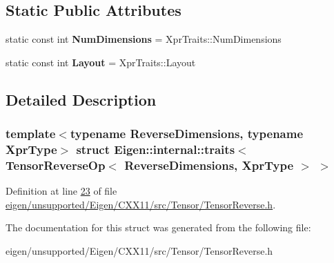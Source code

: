 \subsection*{Static Public Attributes}
\begin{DoxyCompactItemize}
\item 
\mbox{\label{struct_eigen_1_1internal_1_1traits_3_01_tensor_reverse_op_3_01_reverse_dimensions_00_01_xpr_type_01_4_01_4_ae645d2c666520240127ce165559bd119}} 
static const int {\bfseries Num\+Dimensions} = Xpr\+Traits\+::\+Num\+Dimensions
\item 
\mbox{\label{struct_eigen_1_1internal_1_1traits_3_01_tensor_reverse_op_3_01_reverse_dimensions_00_01_xpr_type_01_4_01_4_a768552b47a97062a820957d69eee9915}} 
static const int {\bfseries Layout} = Xpr\+Traits\+::\+Layout
\end{DoxyCompactItemize}


\subsection{Detailed Description}
\subsubsection*{template$<$typename Reverse\+Dimensions, typename Xpr\+Type$>$\newline
struct Eigen\+::internal\+::traits$<$ Tensor\+Reverse\+Op$<$ Reverse\+Dimensions, Xpr\+Type $>$ $>$}



Definition at line \hyperlink{eigen_2unsupported_2_eigen_2_c_x_x11_2src_2_tensor_2_tensor_reverse_8h_source_l00023}{23} of file \hyperlink{eigen_2unsupported_2_eigen_2_c_x_x11_2src_2_tensor_2_tensor_reverse_8h_source}{eigen/unsupported/\+Eigen/\+C\+X\+X11/src/\+Tensor/\+Tensor\+Reverse.\+h}.



The documentation for this struct was generated from the following file\+:\begin{DoxyCompactItemize}
\item 
eigen/unsupported/\+Eigen/\+C\+X\+X11/src/\+Tensor/\+Tensor\+Reverse.\+h\end{DoxyCompactItemize}
